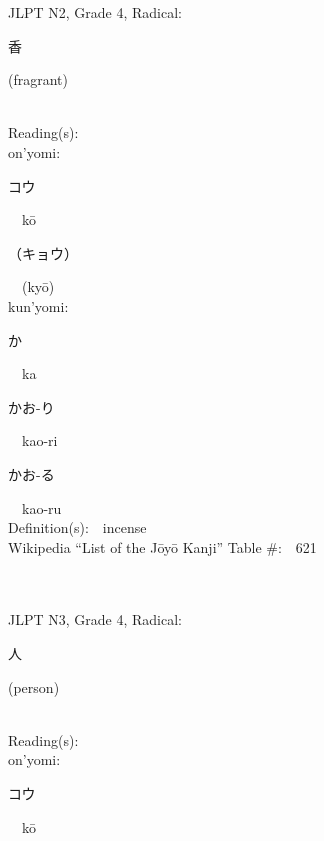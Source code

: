 \begin{multicols}{2}
{JLPT N2, Grade 4, Radical:\ \ {\begin{CJK}{UTF8}{min} 香 \end{CJK}} (fragrant) } \\
Reading(s):\ \ \\
{\hspace*{1em}}on'yomi:\ \ \\
{\hspace*{2em}}{\begin{CJK}{UTF8}{min} コウ \end{CJK}}\ \ k\=o\ \ \\
{\hspace*{2em}}{\begin{CJK}{UTF8}{min} （キョウ） \end{CJK}}\ \ (ky\=o)\ \ \\
{\hspace*{1em}}kun'yomi:\ \ \\
{\hspace*{2em}}{\begin{CJK}{UTF8}{min} か \end{CJK}}\ \ ka\ \ \\
{\hspace*{2em}}{\begin{CJK}{UTF8}{min} かお-り \end{CJK}}\ \ kao-ri\ \ \\
{\hspace*{2em}}{\begin{CJK}{UTF8}{min} かお-る \end{CJK}}\ \ kao-ru\ \ \\
Definition(s):\ \ incense \\
Wikipedia ``List of the J\=oy\=o Kanji'' Table \#:\ \ 621 \\
\ \ \\
{\fontsize{34pt}{40pt}  }\ \ \\  %
{JLPT N3, Grade 4, Radical:\ \ {\begin{CJK}{UTF8}{min} 人 \end{CJK}} (person) } \\
Reading(s):\ \ \\
{\hspace*{1em}}on'yomi:\ \ \\
{\hspace*{2em}}{\begin{CJK}{UTF8}{min} コウ \end{CJK}}\ \ k\=o\ \ \\

\end{multicols}
